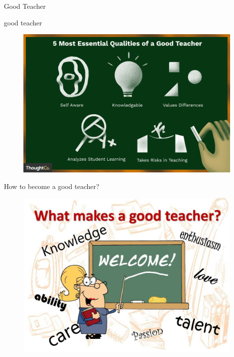 \documentclass[
  ignorenonframetext,
]{beamer}
\begin{document}
\begin{frame}{Good Teacher}
\protect\hypertarget{good-teacher}{}
\begin{block}{good teacher}
\protect\hypertarget{good-teacher-1}{}
\begin{figure}

{\centering \includegraphics[width=7.30208in,height=\textheight]{images/good_teacher.png}

}

\end{figure}
\end{block}

\begin{block}{How to become a good teacher?}
\protect\hypertarget{how-to-become-a-good-teacher}{}
\begin{figure}

{\centering \includegraphics[width=7.04167in,height=\textheight]{images/good_teacher1.jpg}

}

\end{figure}
\end{block}
\end{frame}
\end{document}
